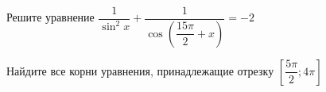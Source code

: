\begin{ex}
	\begin{condition}
		\begin{enumcols}[label=\asbuk*)]
			\item Решите уравнение \(\dfrac{1}{\sin^2 x} + \dfrac{1}{\cos{\left(\dfrac{15\pi}{2} + x\right)}} = -2 \)
			\item Найдите все корни уравнения, принадлежащие отрезку \( \left[\dfrac{5\pi}{2};4\pi\right] \)
		\end{enumcols}
	\end{condition}
\end{ex}